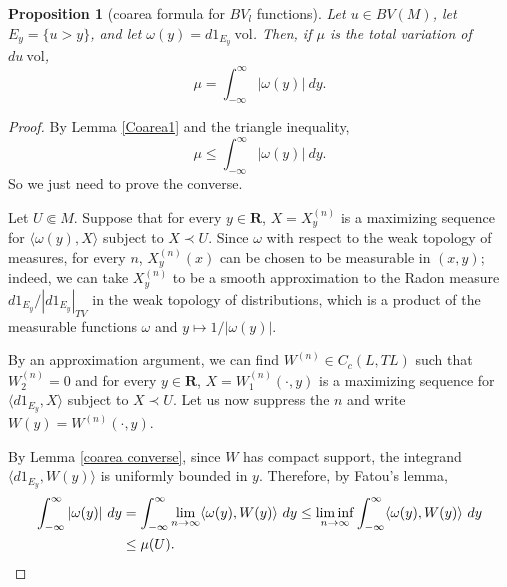 \documentclass[reqno,12pt,letterpaper]{amsart}
\newcommand{\RR}{\mathbf{R}}
\newcommand{\vol}{\mathrm{vol}}
\newtheorem{proposition}[theorem]{Proposition}
\theoremstyle{definition}
\numberwithin{equation}{section}
\begin{document}
\begin{proposition}[coarea formula for $BV_l$ functions]\label{Coarea2}
Let $u \in BV(M)$, let $E_y = \{u > y\}$, and let $\omega(y) = d1_{E_y} ~\vol$.
Then, if $\mu$ is the total variation of $du ~\vol$,
$$\mu = \int_{-\infty}^\infty |\omega(y)| ~dy.$$
\end{proposition}
\begin{proof}
By Lemma \ref{Coarea1} and the triangle inequality,
$$\mu \leq \int_{-\infty}^\infty |\omega(y)| ~dy.$$
So we just need to prove the converse.

Let $U \Subset M$.
Suppose that for every $y \in \RR$, $X = X^{(n)}_y$ is a maximizing sequence for $\langle \omega(y), X\rangle$ subject to $X \prec U$.
Since $\omega$ with respect to the weak topology of measures, for every $n$, $X^{(n)}_y(x)$ can be chosen to be measurable in $(x, y)$; indeed, we can take $X^{(n)}_y$ to be a smooth approximation to the Radon measure $d 1_{E_y}/|d 1_{E_y}|_{TV}$ in the weak topology of distributions, which is a product of the measurable functions $\omega$ and $y \mapsto 1/|\omega(y)|$.

By an approximation argument, we can find $W^{(n)} \in C_c(L, TL)$ such that $W^{(n)}_2 = 0$ and for every $y \in \RR$, $X = W^{(n)}_1(\cdot, y)$ is a maximizing sequence for $\langle d 1_{E_y}, X\rangle$ subject to $X \prec U$.
Let us now suppress the $n$ and write $W(y) = W^{(n)}(\cdot, y)$.

By Lemma \ref{coarea converse}, since $W$ has compact support, the integrand $\langle d 1_{E_y}, W(y)\rangle$ is uniformly bounded in $y$.
Therefore, by Fatou's lemma,
\begin{align*}
\int_{-\infty}^\infty |\omega(y)| ~dy &= \int_{-\infty}^\infty \lim_{n \to \infty} \langle \omega(y), W(y)\rangle ~dy \leq \liminf_{n \to \infty} \int_{-\infty}^\infty \langle \omega(y), W(y)\rangle ~dy \\
&\leq \mu(U). \qedhere
\end{align*}
\end{proof}



\printbibliography
\end{document}
